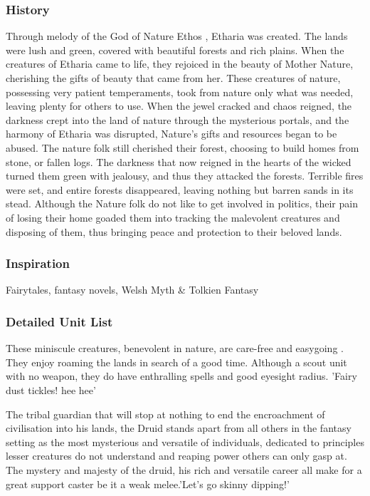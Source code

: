 \documentclass[a4paper,twocolumn]{article}
\begin{document}
\subsubsection{History}

Through melody of the God of Nature Ethos , Etharia was created. The lands were lush and green, covered with beautiful forests and rich plains. When the creatures of Etharia came to life, they rejoiced in the beauty of Mother Nature, cherishing the gifts of beauty that came from her. These creatures of nature, possessing very patient temperaments, took from nature only what was needed, leaving plenty for others to use. When the jewel cracked and chaos reigned, the darkness crept into the land of nature through the mysterious portals, and the harmony of Etharia was disrupted, Nature's gifts and resources began to be abused. The nature folk still cherished their forest, choosing to build homes from stone, or fallen logs. The darkness that now reigned in the hearts of the wicked turned them green with jealousy, and thus they attacked the forests. Terrible fires were set, and entire forests disappeared, leaving nothing but barren sands in its stead. Although the Nature folk do not like to get involved in politics, their pain of losing their home goaded them into tracking the malevolent creatures and disposing of them, thus bringing peace and protection to their beloved lands. 

\subsubsection{Inspiration}
Fairytales, fantasy novels, Welsh Myth \& Tolkien Fantasy

\subsubsection{Detailed Unit List}

These miniscule creatures, benevolent in nature, are care-free and easygoing . They enjoy roaming the lands in search of a good time. Although a scout unit with no weapon, they do have enthralling spells and good eyesight radius. 'Fairy dust tickles! hee hee'

The tribal guardian that will stop at nothing to end the encroachment of civilisation into his lands, the Druid stands apart from all others in the fantasy setting as the most mysterious and versatile of individuals, dedicated to principles lesser creatures do not understand and reaping power others can only gasp at. The mystery and majesty of the druid, his rich and versatile career all make for a great support caster be it a weak melee.'Let's go skinny dipping!'
\end{document}
